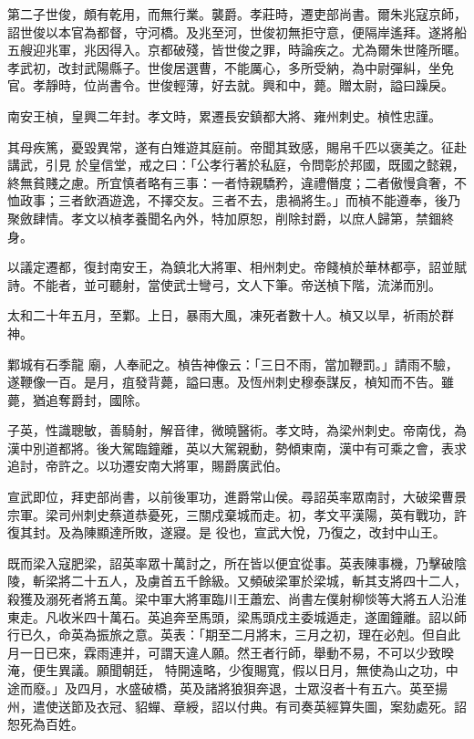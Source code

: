 \begin{pinyinscope}
 第二子世俊，頗有乾用，而無行業。襲爵。孝莊時，遷吏部尚書。爾朱兆寇京師，詔世俊以本官為都督，守河橋。及兆至河，世俊初無拒守意，便隔岸遙拜。遂將船五艘迎兆軍，兆因得入。京都破殘，皆世俊之罪，時論疾之。尤為爾朱世隆所暱。孝武初，改封武陽縣子。世俊居選曹，不能厲心，多所受納，為中尉彈糾，坐免官。孝靜時，位尚書令。世俊輕薄，好去就。興和中，薨。贈太尉，謚曰躁戾。



 南安王楨，皇興二年封。孝文時，累遷長安鎮都大將、雍州刺史。楨性忠謹。



 其母疾篤，憂毀異常，遂有白雉遊其庭前。帝聞其致感，賜帛千匹以褒美之。征赴講武，引見
 於皇信堂，戒之曰：「公孝行著於私庭，令問彰於邦國，既國之懿親，終無貧賤之慮。所宜慎者略有三事：一者恃親驕矜，違禮僭度；二者傲慢貪奢，不恤政事；三者飲酒遊逸，不擇交友。三者不去，患禍將生。」而楨不能遵奉，後乃聚斂肆情。孝文以楨孝養聞名內外，特加原恕，削除封爵，以庶人歸第，禁錮終身。



 以議定遷都，復封南安王，為鎮北大將軍、相州刺史。帝餞楨於華林都亭，詔並賦詩。不能者，並可聽射，當使武士彎弓，文人下筆。帝送楨下階，流涕而別。



 太和二十年五月，至鄴。上日，暴雨大風，凍死者數十人。楨又以旱，祈雨於群神。



 鄴城有石季龍
 廟，人奉祀之。楨告神像云：「三日不雨，當加鞭罰。」請雨不驗，遂鞭像一百。是月，疽發背薨，謚曰惠。及恆州刺史穆泰謀反，楨知而不告。雖薨，猶追奪爵封，國除。



 子英，性識聰敏，善騎射，解音律，微曉醫術。孝文時，為梁州刺史。帝南伐，為漢中別道都將。後大駕臨鐘離，英以大駕親動，勢傾東南，漢中有可乘之會，表求追討，帝許之。以功遷安南大將軍，賜爵廣武伯。



 宣武即位，拜吏部尚書，以前後軍功，進爵常山侯。尋詔英率眾南討，大破梁曹景宗軍。梁司州刺史蔡道恭憂死，三關戍棄城而走。初，孝文平漢陽，英有戰功，許復其封。及為陳顯達所敗，遂寢。是
 役也，宣武大悅，乃復之，改封中山王。



 既而梁入寇肥梁，詔英率眾十萬討之，所在皆以便宜從事。英表陳事機，乃擊破陰陵，斬梁將二十五人，及虜首五千餘級。又頻破梁軍於梁城，斬其支將四十二人，殺獲及溺死者將五萬。梁中軍大將軍臨川王蕭宏、尚書左僕射柳惔等大將五人沿淮東走。凡收米四十萬石。英追奔至馬頭，梁馬頭戍主委城遁走，遂圍鐘離。詔以師行已久，命英為振旅之意。英表：「期至二月將末，三月之初，理在必剋。但自此月一日已來，霖雨連并，可謂天違人願。然王者行師，舉動不易，不可以少致暌淹，便生異議。願聞朝廷，
 特開遠略，少復賜寬，假以日月，無使為山之功，中途而廢。」及四月，水盛破橋，英及諸將狼狽奔退，士眾沒者十有五六。英至揚州，遣使送節及衣冠、貂蟬、章綬，詔以付典。有司奏英經算失圖，案劾處死。詔恕死為百姓。




\end{pinyinscope}
